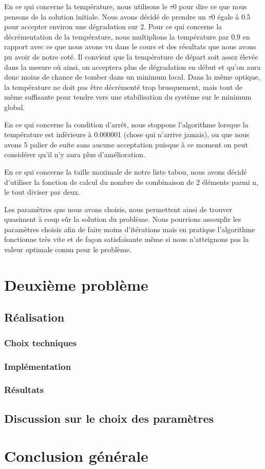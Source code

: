 \documentclass{report}
\begin{document}
En ce qui concerne la température, nous utilisons le $\tau 0$ pour dire ce que nous pensons de la solution initiale. Nous avons décidé de prendre un $\tau 0$ égale à 0.5 pour accepter environ une dégradation sur 2. Pour ce qui concerne la décrémentation de la température, nous multiplions la température par 0.9 en rapport avec ce que nous avons vu dans le cours et des résultats que nous avons pu avoir de notre coté. Il convient que la température de départ soit assez élevée dans la mesure où ainsi, on acceptera plus de dégradation en début et qu'on aura donc moins de chance de tomber dans un minimum local. Dans la même optique, la température ne doit pas être décrémenté trop brusquement, mais tout de même suffisante pour tendre vers une stabilisation du système sur le minimum global.

En ce qui concerne la condition d'arrêt, nous stoppons l'algorithme lorsque la température est inférieure à 0.000001 (chose qui n'arrive jamais), ou que nous avons 5 palier de suite sans aucune acceptation puisque à ce moment on peut considérer qu'il n'y aura plus d'amélioration.

En ce qui concerne la taille maximale de notre liste tabou, nous avons décidé d'utiliser la fonction de calcul du nombre de combinaison de 2 éléments parmi n, le tout diviser par deux.

Les paramètres que nous avons choisis, nous permettent ainsi de trouver quasiment à coup sûr la solution du problème. Nous pourrions assouplir les paramètres choisis afin de faire moins d'itérations mais en pratique l'algorithme fonctionne très vite et de façon satisfaisante même si nous n'atteignons pas la valeur optimale connu pour le problème.

\newpage

\chapter{Deuxième problème}
\minitoc
\section{Réalisation}
\subsection{Choix techniques}

\subsection{Implémentation}

\subsection{Résultats}

\section{Discussion sur le choix des paramètres}

\chapter{Conclusion générale}
\end{document}
